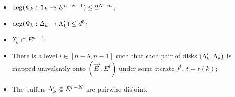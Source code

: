 \begin{itemize}

\item [(P1)] $\deg(\Psi_k: \Upsilon_k\rightarrow E^{n-N-1} )\leq 2^{N+m}$;

\item[(P2)] $\deg(\Psi_k: {\Delta}_k\rightarrow {\Lambda}_k')\leq d^5$;


\item [(P3)] $\Upsilon_k\subset E^{n-1}$;

\item[(P4)] There is a level $i\in [n-5, n-1]$ such that each pair of disks $({\Lambda}_k', {\Lambda}_k)$ is
mapped  univalently onto  $( \hat E^i,  E^i)$ under some iterate $f^t$, $t=t(k)$;

\item[(P5)] The buffers ${\Lambda}_k'\Subset E^{n-N}$ are pairwise disjoint.

\end{itemize}
